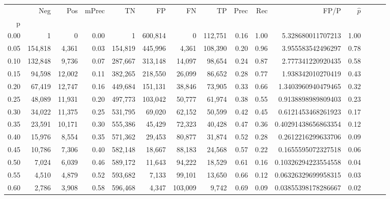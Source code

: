 \begin{tabular}{rrrrrrrrrrrrrrr}
\toprule
{} &      Neg &     Pos & mPrec &       TN &       FP &       FN &       TP &  Prec &   Rec &                   FP/P & $\hat{p}$ \\
p    &          &         &       &          &          &          &          &       &       &                        &           \\
\midrule
0.00 &        1 &       0 &  0.00 &        1 &  600,814 &        0 &  112,751 &  0.16 &  1.00 &      5.328680011707213 &      1.00 \\
0.05 &  154,818 &   4,361 &  0.03 &  154,819 &  445,996 &    4,361 &  108,390 &  0.20 &  0.96 &      3.955583542496297 &      0.78 \\
0.10 &  132,848 &   9,736 &  0.07 &  287,667 &  313,148 &   14,097 &   98,654 &  0.24 &  0.87 &      2.777341220920435 &      0.58 \\
0.15 &   94,598 &  12,002 &  0.11 &  382,265 &  218,550 &   26,099 &   86,652 &  0.28 &  0.77 &      1.938342010270419 &      0.43 \\
0.20 &   67,419 &  12,747 &  0.16 &  449,684 &  151,131 &   38,846 &   73,905 &  0.33 &  0.66 &     1.3403960940479465 &      0.32 \\
0.25 &   48,089 &  11,931 &  0.20 &  497,773 &  103,042 &   50,777 &   61,974 &  0.38 &  0.55 &     0.9138898989809403 &      0.23 \\
0.30 &   34,022 &  11,375 &  0.25 &  531,795 &   69,020 &   62,152 &   50,599 &  0.42 &  0.45 &     0.6121453468261923 &      0.17 \\
0.35 &   23,591 &  10,171 &  0.30 &  555,386 &   45,429 &   72,323 &   40,428 &  0.47 &  0.36 &    0.40291438656863354 &      0.12 \\
0.40 &   15,976 &   8,554 &  0.35 &  571,362 &   29,453 &   80,877 &   31,874 &  0.52 &  0.28 &     0.2612216299633706 &      0.09 \\
0.45 &   10,786 &   7,306 &  0.40 &  582,148 &   18,667 &   88,183 &   24,568 &  0.57 &  0.22 &     0.1655595072327518 &      0.06 \\
0.50 &    7,024 &   6,039 &  0.46 &  589,172 &   11,643 &   94,222 &   18,529 &  0.61 &  0.16 &    0.10326294223554558 &      0.04 \\
0.55 &    4,510 &   4,879 &  0.52 &  593,682 &    7,133 &   99,101 &   13,650 &  0.66 &  0.12 &    0.06326329699958315 &      0.03 \\
0.60 &    2,786 &   3,908 &  0.58 &  596,468 &    4,347 &  103,009 &    9,742 &  0.69 &  0.09 &    0.03855398178286667 &      0.02 \\

\end{tabular}
